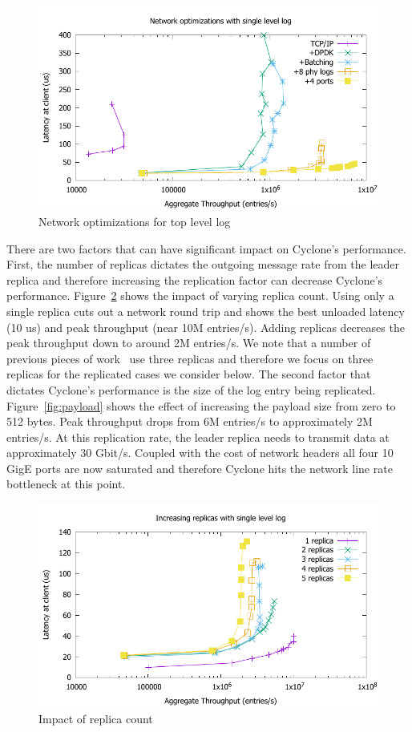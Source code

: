 \documentclass[10pt, preprint, nonatbib]{sigplanconf}
\begin{document}
\begin{figure}
\includegraphics[scale=0.6]{results2/network_opts.pdf}
\caption{Network optimizations for top level log}
\label{fig:network_opts}
\end{figure}

There are two factors that can have significant impact on Cyclone's
performance. First, the number of replicas dictates the outgoing message rate
from the leader replica and therefore increasing the replication factor can
decrease Cyclone's performance. Figure~\ref{fig:replicas} shows the impact of
varying replica count. Using only a single replica cuts out a network round trip
and shows the best unloaded latency (10 us) and peak throughput (near 10M
entries/s). Adding replicas decreases the peak throughput down to around 2M
entries/s. We note that a number of previous pieces of work~\cite{faast, farm}
use three replicas and therefore we focus on three replicas for the replicated
cases we consider below. The second factor that dictates Cyclone's performance
is the size of the log entry being replicated. Figure~\ref{fig:payload} shows
the effect of increasing the payload size from zero to 512 bytes. Peak
throughput drops from 6M entries/s to approximately 2M entries/s. At this
replication rate, the leader replica needs to transmit data at approximately 30
Gbit/s. Coupled with the cost of network headers all four 10 GigE ports are now
saturated and therefore Cyclone hits the network line rate bottleneck at this
point.

\begin{figure}
\includegraphics[scale=0.6]{results2/replicas.pdf}
\caption{Impact of replica count}
\label{fig:replicas}
\end{figure}
\end{document}
